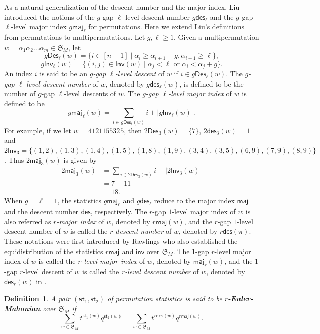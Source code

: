 \documentclass[12pt]{article}
\numberwithin{equation}{section}
\theoremstyle{plain}
\newtheorem{definition}[theorem]{Definition}
\def\des{\mathsf{des}}
\def\maj{\mathsf{maj}}
\def\st{\mathsf{st}}
\def\Inv{\mathsf{Inv}}
\def\Des{\mathsf{Des}}
\def\inv{\mathsf{inv}}
\begin{document}
	As a natural generalization of  the descent number and the major index, 
	Liu~\cite{Liujcta} introduced the notions of the  $g$-gap $\ell$-level descent number  $g\des_\ell$ and  the $g$-gap $\ell$-level major index $g\maj_\ell$ for permutations.  Here we extend Liu's definitions from permutations to multipermutations. 
	Let $g,\ell\geq 1$. Given a multipermutation $w=\alpha_1\alpha_2\ldots \alpha_m\in \mathfrak{S}_{M}$, let 
	$$
	g\Des_\ell(w)=\{i\in [n-1]\mid \alpha_{i} \geq  \alpha_{i+1}+g, \alpha_{i+1} \geq \ell\},
	$$
	$$
	g\Inv_\ell(w)=\{(i,j)\in \Inv(w)\mid\alpha_{j}<\ell \,\, \mbox{or}\,\, \alpha_i<\alpha_j+g\}.
	$$
	An index $i$ is said to be an {\em $g$-gap $\ell$-level descent}  of $w$ if $i\in g\Des_\ell(w) $. The {\em $g$-gap $\ell$-level descent number} of $w$, denoted by $g\des_\ell(w)$, is defined to be the number of $g$-gap $\ell$-level descents of $w$.
	The {\em $g$-gap $\ell$-level major index} of $w$ is defined to be 
	\begin{equation*}
		g\maj_\ell(w) = \sum\limits_{i\in g\Des_\ell(w)}i +|g\Inv_\ell(w)|. 
	\end{equation*}
	For example, if we let $w=4121155325$, then  $2\Des_3(w)=\{7\}$, $2\des_3(w)=1$ and $2\Inv_3=\{(1,2),(1,3),(1,4),(1,5),(1,8),(1,9),(3,4),(3,5),(6,9),(7,9),(8,9)\}$. Thus $2\maj_3(w)$ is given by 
	$$
	\begin{array}{ll}
		2\maj_3(w)
		&=\sum\limits_{i\in 2\Des_3(w)}i +|2\Inv_3(w)|\\
		&=7+11\\
		&=18.
	\end{array}
	$$
	When $g=\ell=1$, the statistics $g\maj_{\ell}$ and $g\des_{\ell}$ reduce to the   major index   $\maj$  and the   descent number $\des$, respectively.
	The $r$-gap $1$-level major index  of $w$  is also referred as  {\em     $r$-major index}  of $w$, denoted by $r\maj(w)$,  and the $r$-gap $1$-level descent number  of $w$ is called the {\em $r$-descent number}  of $w$, denoted by $r\des(\pi)$. These  notations were first  introduced   by Rawlings \cite{Raw, Raw1}  who also established the equidistribution of   the statistics $r\maj$ and $\inv$   over $\mathfrak{S}_M$.  
	The $1$-gap $r$-level major index  of $w$ is called the {\em     $r$-level major index}  of $w$, denoted by $ \maj_r(w)$,  and the $1$-gap $r$-level descent  of $w$ is called the {\em $r$-level descent number}  of $w$, denoted by $ \des_{r}(w)$ in \cite{Liujcta}.
	\begin{definition}
		A pair  $(\st_1, \st_2)$  of permutation statistics is said to be {\bf $r$-Euler-Mahonian} over  $\mathfrak{S}_{M}$ if 
		$$
		\sum\limits_{w\in \mathfrak{S}_{M}}  t^{\st_1(w)}q^{\st_2(w)}=  \sum\limits_{w\in \mathfrak{S}_{M}}  t^{r\des(w)}q^{r\maj(w)}.
		$$
	\end{definition}
\end{document}

